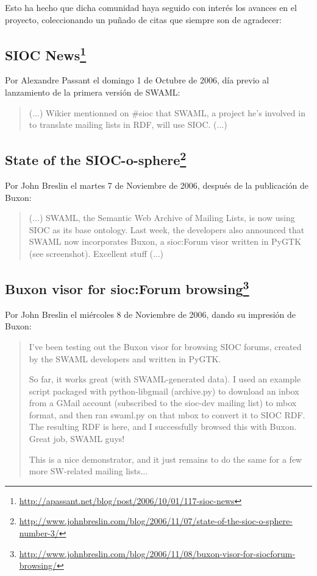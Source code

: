 Esto ha hecho que dicha comunidad haya seguido con interés los avances en el proyecto,
coleccionando un puñado de citas que siempre son de agradecer:

\subsection*{SIOC News\footnote{\url{http://apassant.net/blog/post/2006/10/01/117-sioc-news}}}

Por Alexandre Passant el domingo 1 de Octubre de 2006, día previo al lanzamiento 
de la primera versión de SWAML:

\begin{quote}
 (...) Wikier mentionned on \#sioc that SWAML, a project he's involved in to translate mailing 
 lists in RDF, will use SIOC. (...)
\end{quote}

\subsection*{State of the SIOC-o-sphere\footnote{\url{http://www.johnbreslin.com/blog/2006/11/07/state-of-the-sioc-o-sphere-number-3/}}}

Por John Breslin el martes 7 de Noviembre de 2006, después de la publicación de Buxon:

\begin{quote}
 (...) SWAML, the Semantic Web Archive of Mailing Lists, is now using SIOC as its base 
 ontology. Last week, the developers also announced that SWAML now incorporates Buxon, a sioc:Forum 
 visor written in PyGTK (see screenshot). Excellent stuff  (...)
\end{quote}

\subsection*{Buxon visor for sioc:Forum browsing\footnote{\url{http://www.johnbreslin.com/blog/2006/11/08/buxon-visor-for-siocforum-browsing/}}}

Por John Breslin el miércoles 8 de Noviembre de 2006, dando su impresión de Buxon:

\begin{quote}
 I've been testing out the Buxon visor for browsing SIOC forums, created by the SWAML 
 developers and written in PyGTK.

 So far, it works great (with SWAML-generated data). I used an example script packaged 
 with python-libgmail (archive.py) to download an inbox from a GMail account (subscribed 
 to the sioc-dev mailing list) to mbox format, and then ran swaml.py on that mbox to 
 convert it to SIOC RDF. The resulting RDF is here, and I successfully browsed this with 
 Buxon. Great job, SWAML guys!

 This is a nice demonstrator, and it just remains to do the same for a few more 
 SW-related mailing lists...
\end{quote}

